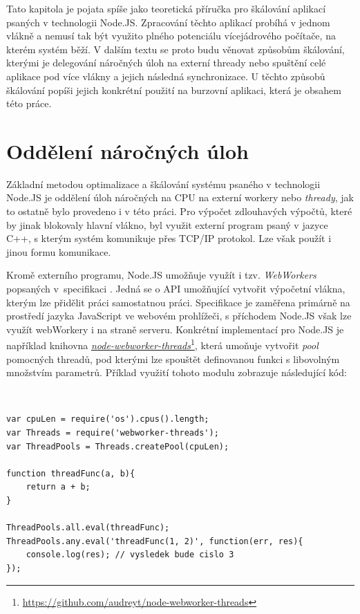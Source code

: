 \documentclass[thesis=M,czech]{FITthesis}[2012/06/26]
\newcommand\fnurl[2]{\href{#2}{#1}\footnote{\url{#2}}}
\begin{document}
	Tato kapitola je pojata spíše jako teoretická příručka pro škálování aplikací psaných v technologii Node.JS. Zpracování těchto aplikací probíhá v jednom vlákně a nemusí tak být využito plného potenciálu vícejádrového počítače, na kterém systém běží. V dalším textu se proto budu věnovat způsobům škálování, kterými je delegování náročných úloh na externí thready nebo spuštění celé aplikace pod více vlákny a jejich následná synchronizace. U těchto způsobů škálování popíši jejich konkrétní použití na burzovní aplikaci, která je obsahem této práce.
	
\section{Oddělení náročných úloh}
	
	Základní metodou optimalizace a škálování systému psaného v technologii Node.JS je oddělení úloh náročných na CPU na externí workery nebo \textit{thready}, jak to ostatně bylo provedeno i v této práci. Pro výpočet zdlouhavých výpočtů, které by jinak blokovaly hlavní vlákno, byl využit externí program psaný v jazyce C++, s kterým systém komunikuje přes TCP/IP protokol. Lze však použít i jinou formu komunikace.
	
	Kromě externího programu, Node.JS umožňuje využít i tzv. \textit{WebWorkers} popsaných v~specifikaci \cite{WebWorkers}. Jedná se o API umožňující vytvořit výpočetní vlákna, kterým lze přidělit práci samostatnou práci. Specifikace je zaměřena primárně na prostředí jazyka JavaScript ve webovém prohlížeči, s příchodem Node.JS však lze využít webWorkery i na straně serveru. Konkrétní implementací pro Node.JS je například knihovna \fnurl{\textit{node-webworker-threads}}{https://github.com/audreyt/node-webworker-threads}, která umoňuje vytvořit \textit{pool} pomocných threadů, pod kterými lze spouštět definovanou funkci s libovolným množstvím parametrů. Příklad využití tohoto modulu zobrazuje následující kód:

~\\

\begin{lstlisting}[basicstyle={\tiny\ttfamily}, frame=single] 
var cpuLen = require('os').cpus().length;
var Threads = require('webworker-threads');
var ThreadPools = Threads.createPool(cpuLen);

function threadFunc(a, b){
	return a + b;
}

ThreadPools.all.eval(threadFunc);
ThreadPools.any.eval('threadFunc(1, 2)', function(err, res){
	console.log(res); // vysledek bude cislo 3
});
\end{lstlisting}
\end{document}

